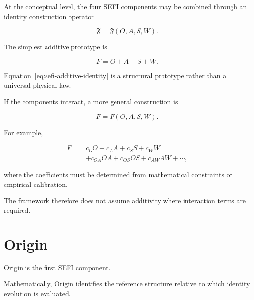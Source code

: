 \documentclass[12pt,oneside]{book}
\begin{document}
At the conceptual level, the four SEFI components may be
combined through an identity construction operator

\begin{equation}
    \mathfrak{F}
    =
    \mathfrak{F}(O,A,S,W).
    \label{eq:general-sefi-construction}
\end{equation}

The simplest additive prototype is

\begin{equation}
    F
    =
    O
    +
    A
    +
    S
    +
    W.
    \label{eq:sefi-additive-identity}
\end{equation}

Equation~\eqref{eq:sefi-additive-identity} is a structural
prototype rather than a universal physical law.

If the components interact, a more general construction is

\begin{equation}
    F
    =
    F(O,A,S,W).
    \label{eq:sefi-general-identity-function}
\end{equation}

For example,

\begin{equation}
\begin{aligned}
    F
    ={}&
    c_O O
    +
    c_A A
    +
    c_S S
    +
    c_W W
    \\
    &+
    c_{OA}OA
    +
    c_{OS}OS
    +
    c_{AW}AW
    +
    \cdots,
\end{aligned}
\label{eq:sefi-coupled-identity}
\end{equation}

where the coefficients must be determined from mathematical
constraints or empirical calibration.

The framework therefore does not assume additivity where
interaction terms are required.


\section{Origin}
\label{sec:identity-origin}

Origin is the first SEFI component.

Mathematically, Origin identifies the reference structure
relative to which identity evolution is evaluated.
\end{document}
